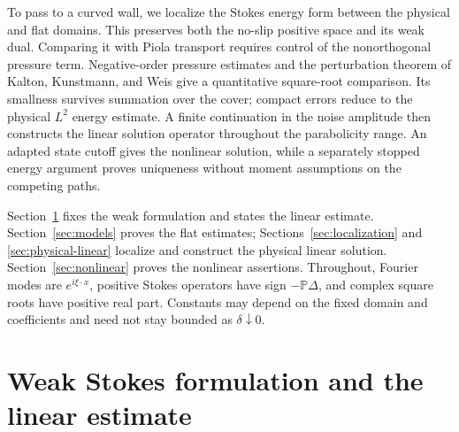 \documentclass[11pt]{article}
\numberwithin{equation}{section}
\theoremstyle{remark}
\newcommand{\PP}{\mathbb P}
\begin{document}
To pass to a curved wall, we localize the Stokes energy form between
the physical and flat domains. This preserves both the no-slip
positive space and its weak dual. Comparing it with Piola transport
requires control of the nonorthogonal pressure term. Negative-order
pressure estimates and the perturbation theorem of Kalton,
Kunstmann, and Weis \cite{KKW} give a quantitative square-root
comparison. Its smallness survives summation over the cover; compact
errors reduce to the physical $L^2$ energy estimate. A finite
continuation in the noise amplitude then constructs the linear
solution operator throughout the parabolicity range. An adapted
state cutoff gives the nonlinear solution, while a separately
stopped energy argument proves uniqueness without moment assumptions
on the competing paths.

Section~\ref{sec:framework} fixes the weak formulation and states the
linear estimate. Section~\ref{sec:models} proves the flat estimates;
Sections~\ref{sec:localization} and \ref{sec:physical-linear} localize
and construct the physical linear solution. Section~\ref{sec:nonlinear}
proves the nonlinear assertions. Throughout, Fourier modes are
$e^{i\xi\cdot x}$, positive Stokes operators have sign $-\PP\Delta$,
and complex square roots have positive real part. Constants may
depend on the fixed domain and coefficients and need not stay
bounded as $\delta\downarrow0$.

\section{Weak Stokes formulation and the linear estimate}\label{sec:framework}
\end{document}
